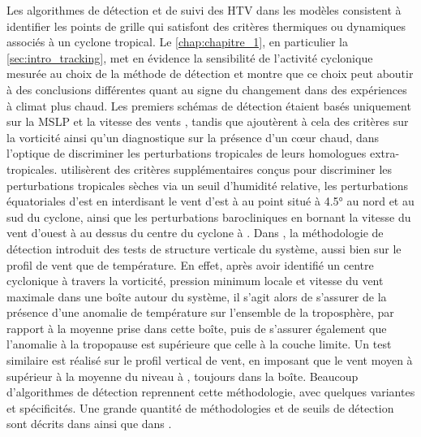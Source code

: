 \documentclass[../main.tex]{subfiles}
\begin{document}
Les algorithmes de détection et de suivi des HTV dans les modèles consistent à identifier les points de grille qui satisfont des critères thermiques ou
dynamiques associés à un cyclone tropical. Le \cref{chap:chapitre_1}, en particulier la \cref{sec:intro_tracking}, met en évidence la sensibilité de l'activité
cyclonique mesurée au choix de la méthode de détection et montre que ce choix peut aboutir à des conclusions différentes quant au signe du changement dans des
expériences à climat plus chaud. Les premiers schémas de détection étaient basés uniquement sur la MSLP et la vitesse des vents
\parencite{bengtsson_simulation_1982,broccoli_can_1990}, tandis que \cite{haarsma_tropical_1993,bengtsson_hurricanetype_1995} ajoutèrent à cela des critères sur
la vorticité ainsi qu'un diagnostique sur la présence d'un cœur chaud, dans l'optique de discriminer les perturbations tropicales de leurs homologues
extra-tropicales. \cite{wu_gcm_1992} utilisèrent des critères supplémentaires conçus pour discriminer les perturbations tropicales sèches via un seuil
d'humidité relative, les perturbations équatoriales d'est en interdisant le vent d'est à  au point situé à \ang{4.5} au nord et au sud du cyclone,
ainsi que les perturbations barocliniques en bornant la vitesse du vent d'ouest à  au dessus du centre du cyclone à . Dans
\cite{bengtsson_hurricanetype_1995}, la méthodologie de détection introduit des tests de structure verticale du système, aussi bien sur le profil de vent que de
température. En effet, après avoir identifié un centre cyclonique à travers la vorticité, pression minimum locale et vitesse du vent maximale dans une boîte
autour du système, il s'agit alors de s'assurer de la présence d'une anomalie de température sur l'ensemble de la troposphère, par rapport à la moyenne prise
dans cette boîte, puis de s'assurer également que l'anomalie à la tropopause est supérieure que celle à la couche limite. Un test similaire est réalisé sur le
profil vertical de vent, en imposant que le vent moyen à  supérieur à la moyenne du niveau à , toujours dans la boîte. Beaucoup d'algorithmes
de détection reprennent cette méthodologie, avec quelques variantes et spécificités. Une grande quantité de méthodologies et de seuils de détection sont décrits
dans \cite{walsh_objectively_2007} ainsi que dans \cite[][Annexe B]{ullrich_tempestextremes_2017}.
\end{document}
